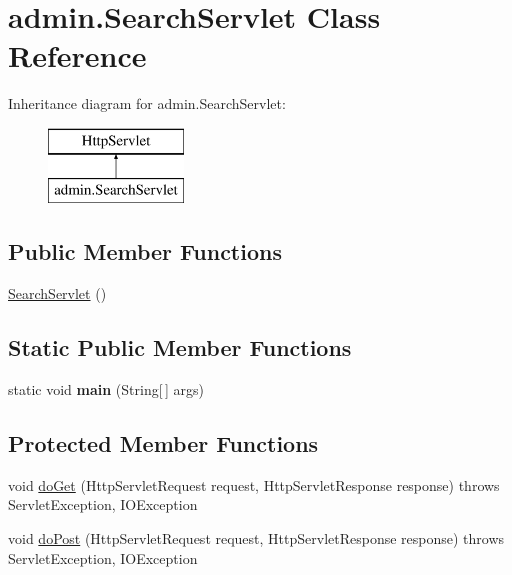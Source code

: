\hypertarget{classadmin_1_1_search_servlet}{}\section{admin.\+Search\+Servlet Class Reference}
\label{classadmin_1_1_search_servlet}
Inheritance diagram for admin.\+Search\+Servlet\+:\begin{figure}[H]
\begin{center}
\leavevmode
\includegraphics[height=2.000000cm]{classadmin_1_1_search_servlet}
\end{center}
\end{figure}
\subsection*{Public Member Functions}
\begin{DoxyCompactItemize}
\item 
\hyperlink{classadmin_1_1_search_servlet_ab50b346d5eff83597546471d03831aa5}{Search\+Servlet} ()
\end{DoxyCompactItemize}
\subsection*{Static Public Member Functions}
\begin{DoxyCompactItemize}
\item 
static void {\bfseries main} (String\mbox{[}$\,$\mbox{]} args)\hypertarget{classadmin_1_1_search_servlet_a28154723497a97fdf737746ffdf234e8}{}\label{classadmin_1_1_search_servlet_a28154723497a97fdf737746ffdf234e8}

\end{DoxyCompactItemize}
\subsection*{Protected Member Functions}
\begin{DoxyCompactItemize}
\item 
void \hyperlink{classadmin_1_1_search_servlet_af33243d76918c14089eccbc1ca0fbf3a}{do\+Get} (Http\+Servlet\+Request request, Http\+Servlet\+Response response)  throws Servlet\+Exception, I\+O\+Exception 
\item 
void \hyperlink{classadmin_1_1_search_servlet_a9183bb5f24ea47c4b159e836e84990d8}{do\+Post} (Http\+Servlet\+Request request, Http\+Servlet\+Response response)  throws Servlet\+Exception, I\+O\+Exception 
\end{DoxyCompactItemize}



